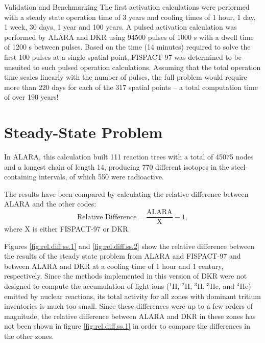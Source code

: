 \begin{chapter}{Validation and Benchmarking}
The first activation calculations were performed with a steady state
operation time of 3 years and cooling times of 1 hour, 1 day, 1
week, 30 days, 1 year and 100 years.  A pulsed activation calculation
was performed by ALARA and DKR using 94500 pulses of 1000 s
with a dwell time of 1200 s between pulses.  Based on the time (14
minutes) required to solve the first 100 pulses at a single spatial
point, FISPACT-97 was determined to be unsuited to such pulsed
operation calculations.  Assuming that the total operation time scales
linearly with the number of pulses, the full problem would require
more than 220 days for each of the 317 spatial points -- a total
computation time of over 190 years!

\section{Steady-State Problem}

In ALARA, this calculation built 111 reaction trees with a total of
45075 nodes and a longest chain of length 14, producing 770 different
isotopes in the steel-containing intervals, of which 550 were
radioactive.

The results have been compared by calculating the relative difference
between ALARA and the other codes:
$$\mbox{Relative Difference} = \frac{\mbox{ALARA}}{\mbox{X}} - 1,$$
where X is either FISPACT-97 or DKR.  

\begin{figure*}[htbp]
  \begin{center}
    \caption{Relative difference between ALARA and other codes for
      steady state problem at a cooling time of 1 century.}
    \label{fig:rel.diff.ss.2}
  \end{center}
\end{figure*}

Figures \ref{fig:rel.diff.ss.1} and \ref{fig:rel.diff.ss.2} show the
relative difference between the results of the steady state problem
from ALARA and FISPACT-97 and between ALARA and DKR at a cooling time
of 1 hour and 1 century, respectively.  Since the methods implemented
in this version of DKR were not designed to compute the accumulation of
light ions ($^1$H, $^2$H, $^3$H, $^3$He, and $^4$He) emitted by
nuclear reactions, its total activity for all zones with dominant
tritium inventories is much too small.  Since these differences were
up to a few orders of magnitude, the relative difference between ALARA
and DKR in these zones has not been shown in figure
\ref{fig:rel.diff.ss.1} in order to compare the differences in the
other zones.


\end{chapter}

